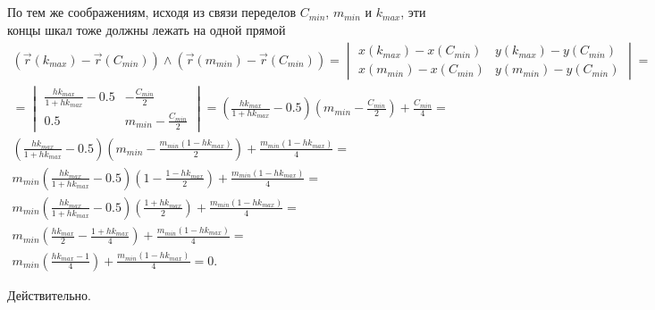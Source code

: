 \subparagraph{}По тем же соображениям, исходя из связи переделов $C_{min}$, $m_{min}$ и $k_{max}$, эти концы шкал тоже должны лежать на одной прямой
$$
\begin{gathered}
	\left(\vec{r}(k_{max}) - \vec{r}(C_{min}) \right) \wedge \left(\vec{r}(m_{min}) - \vec{r}(C_{min}) \right)
	=
	\begin{vmatrix}
		x(k_{max}) - x(C_{min}) & y(k_{max}) - y(C_{min}) \\
		x(m_{min}) - x(C_{min}) & y(m_{min}) - y(C_{min})
	\end{vmatrix}
	=\\	
	=
	\begin{vmatrix}
		\frac{h k_{max}}{1+h k_{max}} - 0.5 & -\frac{C_{min}}{2} \\
		0.5 & m_{min} - \frac{C_{min}}{2}
	\end{vmatrix}
	=
	\left(
		\frac{h k_{max}}{1+h k_{max}} - 0.5
	\right)
	\left(
		m_{min} - \frac{C_{min}}{2}
	\right)
	+  
	\frac{C_{min}}{4} 
	=\\
	\left(
		\frac{h k_{max}}{1+h k_{max}} - 0.5
	\right)
	\left(
		m_{min} - \frac{m_{min} \left( 1 - hk_{max} \right )}{2}
	\right)
	+  
	\frac{m_{min} \left( 1 - hk_{max} \right )}{4} 
	= \\
	m_{min}
	\left(
		\frac{h k_{max}}{1+h k_{max}} - 0.5
	\right)
	\left(
		1 - \frac{1 - hk_{max}}{2}
	\right)
	+  
	\frac{m_{min} \left( 1 - hk_{max} \right )}{4} 
	= \\
	m_{min}
	\left(
		\frac{h k_{max}}{1+h k_{max}} - 0.5
	\right)
	\left(
		\frac{1 + hk_{max}}{2}
	\right)
	+  
	\frac{m_{min} \left( 1 - hk_{max} \right )}{4} 
	= \\
	m_{min}
	\left(
		\frac{h k_{max}}{2} - \frac{1 + hk_{max}}{4}
	\right)
	+  
	\frac{m_{min} \left( 1 - hk_{max} \right )}{4} 
	= \\
	m_{min}
	\left(
		\frac{h k_{max} - 1}{4}
	\right)
	+  
	\frac{m_{min} \left( 1 - hk_{max} \right )}{4} 
	= 0.
\end{gathered}
$$

Действительно.